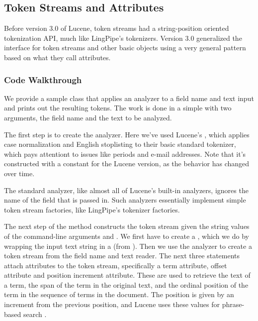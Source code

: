 \subsection{Token Streams and Attributes}

Before version 3.0 of Lucene, token streams had a string-position
oriented tokenization API, much like LingPipe's tokenizers.  Version
3.0 generalized the interface for token streams and other basic
objects using a very general pattern based on what they call
attributes.

\subsubsection{Code Walkthrough}

We provide a sample class  that applies an
analyzer to a field name and text input and prints out the resulting
tokens.  The work is done in a simple  with two
arguments, the field name and the text to be analyzed.  

The first step is to create the analyzer.
%
%
Here we've used Lucene's , which applies case
normalization and English stoplisting to their basic standard
tokenizer, which pays attentiont to issues like periods and e-mail
addresses.  Note that it's constructed with a constant for the Lucene
version, as the behavior has changed over time.

The standard analyzer, like almost all of Lucene's built-in analyzers,
ignores the name of the field that is passed in.  Such analyzers
essentially implement simple token stream factories, like LingPipe's
tokenizer factories.

The next step of the  method constructs the token stream
given the string values of the command-line arguments 
and .  
%
%
We first have to create a , which we do by wrapping the
input text string in a  (from ).
Then we use the analyzer to create a token stream from the field name
and text reader.  The next three statements attach attributes to the
token stream, specifically a term attribute, offset attribute and
position increment attribute.  These are used to retrieve the text of
a term, the span of the term in the original text, and the ordinal
position of the term in the sequence of terms in the document.  The
position is given by an increment from the previous position, and
Lucene uses these values for phrase-based search .

